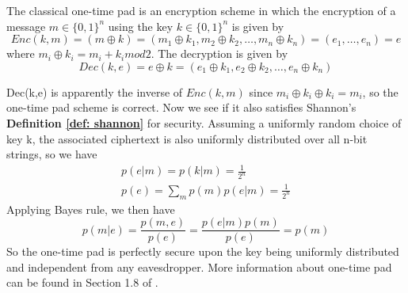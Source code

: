 
\begin{definition} \label{def: classical one-time pad scheme}
The classical one-time pad is an encryption scheme in which the encryption of a message $m \in \{0, 1\}^n$ using the key $k \in \{0, 1\}^n$ is given by
\begin{equation}
    Enc(k,m)=(m \oplus k)=(m_1 \oplus k_1, m_2 \oplus k_2, \hdots, m_n \oplus k_n)=(e_1, \hdots, e_n)=e
\end{equation}
where $m_i \oplus k_i = m_i + k_i mod 2$. The decryption is given by
\begin{equation}
Dec(k, e)=e \oplus k = (e_1 \oplus k_1, e_2 \oplus k_2, \hdots, e_n \oplus k_n)
\end{equation}
\end{definition}
Dec(k,e) is apparently the inverse of $Enc(k,m)$ since $m_i \oplus k_i \oplus k_i=m_i$, so the one-time pad scheme is correct. Now we see if it also satisfies Shannon's \textbf{Definition \ref{def: shannon}} for security. Assuming a uniformly random choice of key k, the associated ciphertext is also uniformly distributed over all n-bit strings, so we have 
\begin{gather}
    p(e|m)=p(k|m)=\frac{1}{2^n}\\
    p(e)=\sum_m p(m) p(e|m)=\frac{1}{2^n}
\end{gather}
Applying Bayes rule, we then have $$p(m|e)=\frac{p(m,e)}{p(e)}=\frac{p(e|m)p(m)}{p(e)}=p(m)$$
So the one-time pad is perfectly secure upon the key being uniformly distributed and independent from any eavesdropper. More information about one-time pad can be found in Section 1.8 of \cite{Wehner:notes}.

